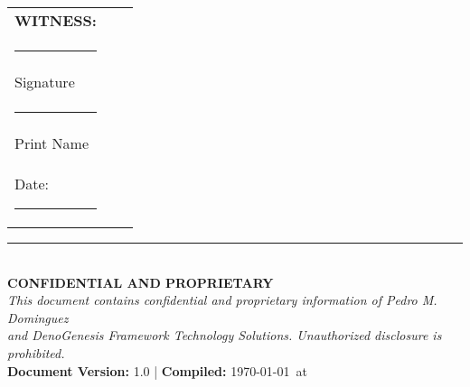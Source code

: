 \documentclass[11pt,letterpaper]{article}
\begin{document}
\begin{tabular}{p{7cm}p{1cm}p{7cm}}
\textbf{WITNESS:} & & \\[1cm]

\rule{6cm}{0.4pt} & & \\
Signature & & \\[0.5cm]

\rule{6cm}{0.4pt} & & \\
Print Name & & \\[0.5cm]

Date: \rule{3cm}{0.4pt} & & \\
\end{tabular}

\vspace{0.5cm}

\begin{center}
\rule{0.9\textwidth}{1pt}\\
\textbf{\textcolor{primaryblue}{CONFIDENTIAL AND PROPRIETARY}}\\
\textit{This document contains confidential and proprietary information of Pedro M. Dominguez\\
and DenoGenesis Framework Technology Solutions. Unauthorized disclosure is prohibited.}\\
\textbf{Document Version:} 1.0 | \textbf{Compiled:} \today\ at \currenttime
\end{center}

\end{document}
